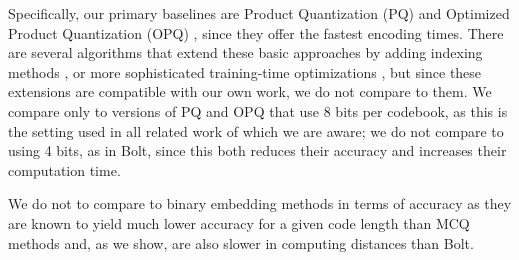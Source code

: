Specifically, our primary baselines are Product Quantization (PQ) \cite{pq} and Optimized Product Quantization (OPQ) \cite{opq}, since they offer the fastest encoding times. There are several algorithms that extend these basic approaches by adding indexing methods \cite{lopq, NOIMI}, or more sophisticated training-time optimizations \cite{googleMips, pairQ, polysemous}, but since these extensions are compatible with our own work, we do not compare to them. We compare only to versions of PQ and OPQ that use 8 bits per codebook, as this is the setting used in all related work of which we are aware; we do not compare to using 4 bits, as in Bolt, since this both reduces their accuracy and increases their computation time.



We do not to compare to binary embedding methods in terms of accuracy as they are known to yield much lower accuracy for a given code length than MCQ methods \cite{hashingSimilaritySurvey, opq} and, as we show, are also slower in computing distances than Bolt. %

